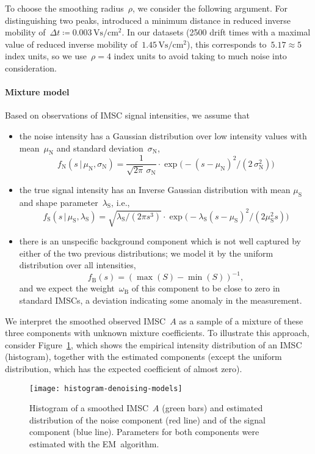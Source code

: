 \documentclass{article}
\newcommand{\given}{\,|\,}
\begin{document}
To choose the smoothing radius~$\rho$, we consider the following argument.
For distinguishing two peaks, \cite{bodeker2008peak} introduced a minimum distance in reduced inverse mobility of~$\Delta t \coloneq 0.003\,\text{Vs}/\text{cm}^2$.
In our datasets (2500 drift times with a maximal value of reduced inverse mobility of~$1.45\,\text{Vs}/\text{cm}^2$), this corresponds to~$5.17 \approx 5$ index units, so we use~$\rho=4$ index units to avoid taking to much noise into consideration.

\paragraph{Mixture model}
Based on observations of IMSC signal intensities, we assume that
\begin{itemize}
\item the noise intensity has a Gaussian distribution over low intensity values with mean~$\mu_{\text{N}}$ and standard deviation~$\sigma_{\text{N}}$,
\[ f_{\text{N}}(s \given \mu_{\text{N}}, \sigma_{\text{N}}) 
   = \frac{1}{\sqrt{2 \pi} \, \sigma_{\text{N}}} \cdot \exp \big( -(s - \mu_{\text{N}})^2 / (2\, \sigma_{\text{N}}^2) \big)
\]
\item the true signal intensity has an Inverse Gaussian distribution with mean $\mu_{\text{S}}$ and shape parameter~$\lambda_{\text{S}}$, i.e.,
\[ f_{\text{S}}(s \given \mu_{\text{S}}, \lambda_{\text{S}}) 
   = \sqrt{\lambda_{\text{S}} / (2 \pi s^3)} \cdot \exp \big( -\lambda_{\text{S}} (s - \mu_{\text{S}})^2 / (2 \mu_{\text{S}}^2 s) \big)
\]
\item there is an unspecific background component which is not well captured by either of the two previous distributions; we model it by the uniform distribution over all intensities,
\[ f_\text{B}(s) = (\max(S) - \min(S))^{-1},
\]
and we expect the weight~$\omega_\text{B}$ of this component to be close to zero in standard IMSCs, a deviation indicating some anomaly in the measurement.
\end{itemize}

We interpret the smoothed observed IMSC~$A$ as a sample of a mixture of these three components with unknown mixture coefficients.
To illustrate this approach, consider Figure~\ref{fig:denoisingmodels}, which shows the empirical intensity distribution of an IMSC (histogram), together with the estimated components (except the uniform distribution, which has the expected coefficient of almost zero).
\begin{figure}[t]
  \centering
  \texttt{[image: histogram-denoising-models]}
  \caption{Histogram of a smoothed IMSC~$A$ (green bars) and estimated distribution of the noise component (red line) and of the signal component (blue line). 
Parameters for both components were estimated with the EM~algorithm.}
  \label{fig:denoisingmodels}
\end{figure}
\end{document}
